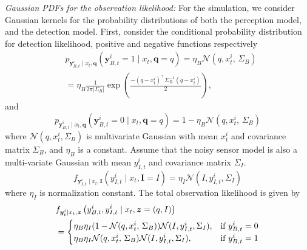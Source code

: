 \documentclass[journal]{IEEEtran}
\begin{document}
\textit{Gaussian PDFs for the observation likelihood:}
For the simulation, we consider Gaussian kernels for the probability distributions of both the perception model, and the detection model.
First, consider the conditional probability distribution for detection likelihood, positive and negative functions respectively
\begin{align*}
&p_{
	\bm{y}_{B,t}^i\mid
	x_t,\bm{q}
}(\bm{y}_{B,t}^i=1\mid x_t,\bm{q}=q)
=\eta_{B}\mathcal{N}(q,x_t^i,\,\Sigma_B) \\
& = \eta_{B}\frac{1}{2\pi\left|\Sigma_B\right|}
\exp\left(
\frac{-(q-x_t^i)^{\top}\Sigma_B^{-1}(q-x_t^i)}{2}
\right),
\end{align*}
and 
\[
p_{
	\bm{y}_{B,t}^i\mid
	x_t,\bm{q}
}(\bm{y}_{B,t}^i=0\mid x_t,\bm{q}=q)
=1-\eta_{B}\mathcal{N}(q,x_t^i,\,\Sigma_B)
\]
where $\mathcal{N}(q,x_t^i,\Sigma_B)$ is multivariate Gaussian with mean $x_t^i$ and covariance matrix $\Sigma_B$, and $\eta_{B}$ is a constant.
Assume that the noisy sensor model is also a multi-variate Gaussian with mean $y_{I,t}^i$ and covariance matrix $\Sigma_I$.
\[
f_{
	\bm{y}_{I,t}^i\mid
	x_t,\bm{I}
}(y_{I,t}^i\mid x_t,\bm{I}=I)
=
\eta_I \mathcal{N}(I,y_{I,t}^i,\Sigma_I)
\]
where $\eta_I$ is normalization constant. The total observation likelihood is given by
\begin{align*}
&f_{\bm{y}_t^i\mid x_t,\bm{z}}
\left(
y_{B,t}^i,y_{I,t}^i \mid x_t,\bm{z}=(q,I)
\right) \\
&=\begin{cases}
\eta_B\eta_I(1-\mathcal{N}(q,x_t^i,\,\Sigma_B))\mathcal{N}(I,y_{I,t}^i,\Sigma_I)
, &\textup{if }y_{B,t}^i = 0 \\
\eta_B\eta_I\mathcal{N}(q,x_t^i,\,\Sigma_B)
\mathcal{N}(I,y_{I,t}^i,\Sigma_I)
, &\textup{if }y_{B,t}^i = 1
\end{cases}
\end{align*}
\end{document}
